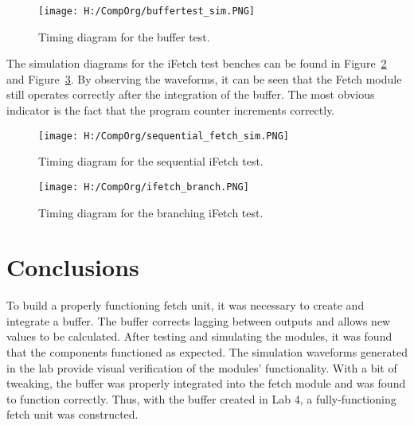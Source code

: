 \documentclass{article}
\begin{document}
\begin{figure}
	\begin{center}
		\caption{Timing diagram for the buffer test.}\label{fig:buffertest}
		\texttt{[image: H:/CompOrg/buffertest\_sim.PNG]}
	\end{center}
\end{figure}

The simulation diagrams for the iFetch test benches can be found in Figure~\ref{fig:seqtest} and Figure~\ref{fig:branchtest}. By observing the waveforms, it can be seen that the Fetch module still operates correctly after the integration of the buffer. The most obvious indicator is the fact that the program counter increments correctly.

\begin{figure}
	\begin{center}
		\caption{Timing diagram for the sequential iFetch test.}\label{fig:seqtest}
		\texttt{[image: H:/CompOrg/sequential\_fetch\_sim.PNG]}
	\end{center}
\end{figure}

\begin{figure}
	\begin{center}
		\caption{Timing diagram for the branching iFetch test.}\label{fig:branchtest}
		\texttt{[image: H:/CompOrg/ifetch\_branch.PNG]}
	\end{center}
\end{figure}


\section{Conclusions}
To build a properly functioning fetch unit, it was necessary to create and integrate a buffer. The buffer corrects lagging between outputs and allows new values to be calculated. After testing and simulating the modules, it was found that the components functioned as expected. The simulation waveforms generated in the lab provide visual verification of the modules' functionality. With a bit of tweaking, the buffer was properly integrated into the fetch module and was found to function correctly. Thus, with the buffer created in Lab 4, a fully-functioning fetch unit was constructed.
\end{document}
